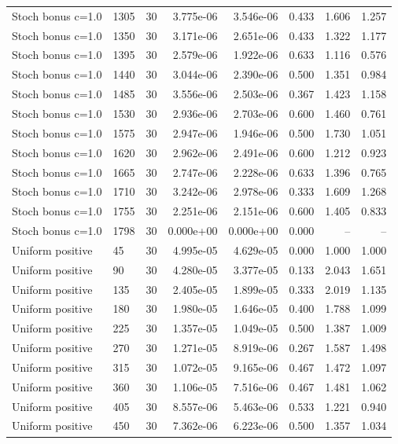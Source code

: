 \begin{scriptsize}
\begin{longtable}{llrrrrrr}
Stoch bonus c=1.0 & 1305 & 30 & 3.775e-06 & 3.546e-06 & 0.433 & 1.606 & 1.257 \\
Stoch bonus c=1.0 & 1350 & 30 & 3.171e-06 & 2.651e-06 & 0.433 & 1.322 & 1.177 \\
Stoch bonus c=1.0 & 1395 & 30 & 2.579e-06 & 1.922e-06 & 0.633 & 1.116 & 0.576 \\
Stoch bonus c=1.0 & 1440 & 30 & 3.044e-06 & 2.390e-06 & 0.500 & 1.351 & 0.984 \\
Stoch bonus c=1.0 & 1485 & 30 & 3.556e-06 & 2.503e-06 & 0.367 & 1.423 & 1.158 \\
Stoch bonus c=1.0 & 1530 & 30 & 2.936e-06 & 2.703e-06 & 0.600 & 1.460 & 0.761 \\
Stoch bonus c=1.0 & 1575 & 30 & 2.947e-06 & 1.946e-06 & 0.500 & 1.730 & 1.051 \\
Stoch bonus c=1.0 & 1620 & 30 & 2.962e-06 & 2.491e-06 & 0.600 & 1.212 & 0.923 \\
Stoch bonus c=1.0 & 1665 & 30 & 2.747e-06 & 2.228e-06 & 0.633 & 1.396 & 0.765 \\
Stoch bonus c=1.0 & 1710 & 30 & 3.242e-06 & 2.978e-06 & 0.333 & 1.609 & 1.268 \\
Stoch bonus c=1.0 & 1755 & 30 & 2.251e-06 & 2.151e-06 & 0.600 & 1.405 & 0.833 \\
Stoch bonus c=1.0 & 1798 & 30 & 0.000e+00 & 0.000e+00 & 0.000 & -- & -- \\
Uniform positive & 45 & 30 & 4.995e-05 & 4.629e-05 & 0.000 & 1.000 & 1.000 \\
Uniform positive & 90 & 30 & 4.280e-05 & 3.377e-05 & 0.133 & 2.043 & 1.651 \\
Uniform positive & 135 & 30 & 2.405e-05 & 1.899e-05 & 0.333 & 2.019 & 1.135 \\
Uniform positive & 180 & 30 & 1.980e-05 & 1.646e-05 & 0.400 & 1.788 & 1.099 \\
Uniform positive & 225 & 30 & 1.357e-05 & 1.049e-05 & 0.500 & 1.387 & 1.009 \\
Uniform positive & 270 & 30 & 1.271e-05 & 8.919e-06 & 0.267 & 1.587 & 1.498 \\
Uniform positive & 315 & 30 & 1.072e-05 & 9.165e-06 & 0.467 & 1.472 & 1.097 \\
Uniform positive & 360 & 30 & 1.106e-05 & 7.516e-06 & 0.467 & 1.481 & 1.062 \\
Uniform positive & 405 & 30 & 8.557e-06 & 5.463e-06 & 0.533 & 1.221 & 0.940 \\
Uniform positive & 450 & 30 & 7.362e-06 & 6.223e-06 & 0.500 & 1.357 & 1.034 \\

\end{longtable}
\end{scriptsize}
